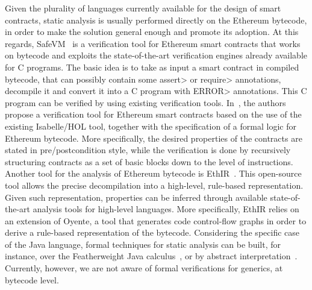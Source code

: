 Given the plurality of languages currently available for the design of smart contracts,
static analysis is usually performed directly on the Ethereum bytecode, in order to make
the solution general enough and promote its adoption. At this regards, SafeVM~\cite{safevm}
is a verification tool for Ethereum smart contracts that works on bytecode and exploits
the state-of-the-art verification engines already available for C programs.
The basic idea is to take as input a smart contract in compiled bytecode, that
can possibly contain some \<assert> or \<require> annotations, decompile it and convert it
into a C program with \<ERROR> annotations. This C program can be verified by using
existing verification tools.
%
In~\cite{hol_smart_constracts}, the authors propose a verification tool for Ethereum
smart contracts based on the use of the existing Isabelle/HOL tool, together with the
specification of a formal logic for Ethereum bytecode. More specifically, the desired properties
of the contracts are stated in pre/postcondition style, while the verification
is done by recursively structuring contracts as a set of basic blocks
down to the level of instructions.
%
Another tool for the analysis of Ethereum bytecode is EthIR~\cite{ethir}. This open-source tool
allows the precise decompilation into a high-level, rule-based representation. Given such
representation, properties can be inferred through available state-of-the-art analysis tools
for high-level languages. More specifically, EthIR relies on an extension of Oyente,
a tool that generates code control-flow graphs in order to derive
a rule-based representation of the bytecode.
%
Considering the specific case of the Java language,
formal techniques for static analysis can be built, for instance, over
the Featherweight Java calculus~\cite{IgarashiPW01}, or by abstract
interpretation~\cite{Spoto16}. Currently, however, we are not aware
of formal verifications for generics, at bytecode level.

